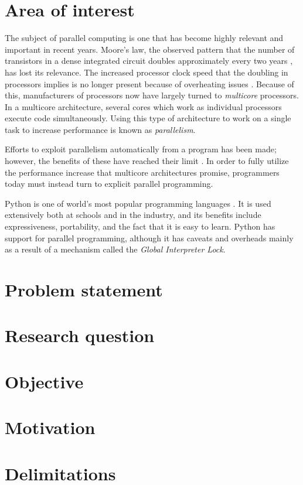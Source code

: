 \section{Area of interest}
The subject of parallel computing is one that has become highly relevant and important in recent years.
Moore's law, the observed pattern that the number of transistors in a dense integrated circuit doubles approximately every two
years \cite{moore_1998_cramming_cmcoic},
has lost its relevance. The increased processor clock speed that the doubling in processors implies is no longer present because of
overheating issues \cite[Ch. 1]{herlihy_2012_art_taomprr}. Because of this, manufacturers of processors now have
largely turned to \emph{multicore} processors. In a multicore architecture, several cores which work as individual processors execute
code simultaneously. Using this type of architecture to work on a single task to increase performance is known as \emph{parallelism}.

Efforts to exploit parallelism automatically from a program has been made; however, the benefits of these have reached their
limit \cite{mccool_2012_structured_spppfec}. In order to fully utilize the performance increase that multicore architectures promise, 
programmers today must instead turn to explicit parallel programming.

Python is one of world's most popular programming languages \cite{krill_2015_python_psnhilp}. It is used extensively both at schools and
in the industry, and its benefits include expressiveness, portability, and the fact that it is easy to learn. Python has support for
parallel programming, although it has caveats and overheads mainly as a result of a mechanism called the \emph{Global Interpreter Lock}.

\section{Problem statement}

\section{Research question}

\section{Objective}

\section{Motivation}

\section{Delimitations}
